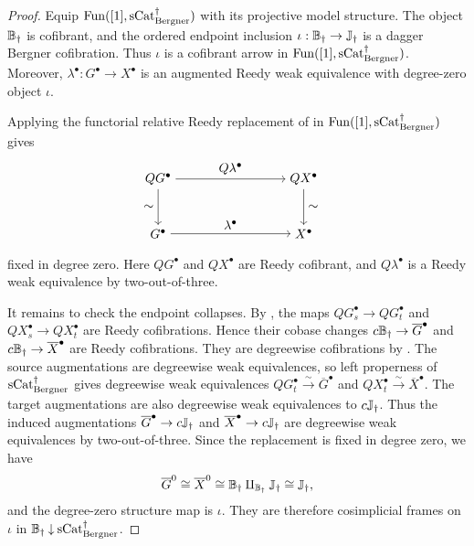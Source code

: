 \documentclass[a4paper,dvipdfmx,11pt]{amsart}
\begin{document}
\begin{proof}
  Equip $\mathrm{Fun}([1],\mathrm{sCat}^{\dag}_{\mathrm{Bergner}})$ with its projective model structure.
  The object $\mathbb{B}_{\dag}$ is cofibrant, and the ordered endpoint inclusion $\iota:\mathbb{B}_{\dag}\to\mathbb{J}_{\dag}$ is a dagger Bergner cofibration.
  Thus $\iota$ is a cofibrant arrow in $\mathrm{Fun}([1],\mathrm{sCat}^{\dag}_{\mathrm{Bergner}})$.
  Moreover, $\lambda^{\bullet}:G^{\bullet}\to X^{\bullet}$ is an augmented Reedy weak equivalence with degree-zero object $\iota$.

  Applying the functorial relative Reedy replacement of \cite[Proposition~16.6.8 (1)]{Hir02} in $\mathrm{Fun}([1],\mathrm{sCat}^{\dag}_{\mathrm{Bergner}})$ gives
  \begin{align}\label{jt.eq.relative-arrow-replacement}
    &\begin{tikzpicture}[auto]
      \node (replacement-source) at (0,1.5) {$QG^{\bullet}$};
      \node (replacement-target) at (4,1.5) {$QX^{\bullet}$};
      \node (source) at (0,0) {$G^{\bullet}$};
      \node (target) at (4,0) {$X^{\bullet}$};
      \draw[->]
        (replacement-source) --
        node[above] {$Q\lambda^{\bullet}$}
        (replacement-target);
      \draw[->]
        (replacement-source) --
        node[left] {$\sim$}
        (source);
      \draw[->]
        (replacement-target) --
        node[right] {$\sim$}
        (target);
      \draw[->]
        (source) --
        node {$\lambda^{\bullet}$}
        (target);
    \end{tikzpicture}
  \end{align}
  fixed in degree zero.
  Here $QG^{\bullet}$ and $QX^{\bullet}$ are Reedy cofibrant, and $Q\lambda^{\bullet}$ is a Reedy weak equivalence by two-out-of-three.

  It remains to check the endpoint collapses.
  By \cite[Theorem~15.5.2]{Hir02}, the maps $QG_s^{\bullet}\to QG_t^{\bullet}$ and $QX_s^{\bullet}\to QX_t^{\bullet}$ are Reedy cofibrations.
  Hence their cobase changes $c\mathbb{B}_{\dag}\to\overline G^{\bullet}$ and $c\mathbb{B}_{\dag}\to\overline X^{\bullet}$ are Reedy cofibrations.
  They are degreewise cofibrations by \cite[Proposition~15.3.11 (1)]{Hir02}.
  The source augmentations are degreewise weak equivalences, so left properness of $\mathrm{sCat}^{\dag}_{\mathrm{Bergner}}$ gives degreewise weak equivalences $QG_t^{\bullet}\xrightarrow{\sim}\overline G^{\bullet}$ and $QX_t^{\bullet}\xrightarrow{\sim}\overline X^{\bullet}$.
  The target augmentations are also degreewise weak equivalences to $c\mathbb{J}_{\dag}$.
  Thus the induced augmentations $\overline G^{\bullet}\to c\mathbb{J}_{\dag}$ and $\overline X^{\bullet}\to c\mathbb{J}_{\dag}$ are degreewise weak equivalences by two-out-of-three.
  Since the replacement is fixed in degree zero, we have
  \begin{align}
    \overline G^0
    \cong 
    \overline X^0
    \cong
    \mathbb{B}_{\dag}
    \amalg_{\mathbb{B}_{\dag}}
    \mathbb{J}_{\dag}
    \cong
    \mathbb{J}_{\dag},
  \end{align}
  and the degree-zero structure map is $\iota$.
  They are therefore cosimplicial frames on $\iota$ in $\mathbb{B}_{\dag}\mathbin{\downarrow} \mathrm{sCat}^{\dag}_{\mathrm{Bergner}}$.


\end{proof}
\end{document}
